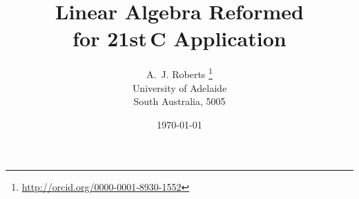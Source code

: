 \documentclass[10pt,a5paper,smallborder,twoside]{refrep}
\title{Linear Algebra Reformed
\\for 21st\,C Application}
\author{A.~J. Roberts
\thanks{\url{http://orcid.org/0000-0001-8930-1552}}
\\University of Adelaide
\\South Australia, 5005}
\date{\today\titlePageInfo}
\begin{document}


\tableofcontents






















































%


%




\begin{draft}
\makeanswers
\end{draft}
\end{document}
